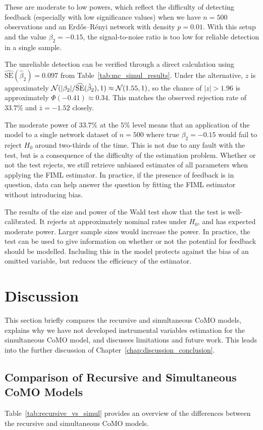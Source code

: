 These are moderate to low powers, which reflect the difficulty of detecting feedback (especially with low significance values) when we have $n = 500$ observations and an Erd\H{o}s--R\'enyi network with density $p = 0.01$. With this setup and the value $\beta_2 = -0.15$, the signal-to-noise ratio is too low for reliable detection in a single sample.

The unreliable detection can be verified through a direct calculation using $\widehat{\text{SE}}(\hat\beta_2) = 0.097$ from Table~\ref{tab:mc_simul_results}. Under the alternative, $z$ is approximately $\mathcal{N}(|\beta_2|/\widehat{\text{SE}}(\hat\beta_2), 1) \approx \mathcal{N}(1.55, 1)$, so the chance of $|z| > 1.96$ is approximately $\Phi(-0.41) \approx 0.34$. This matches the observed rejection rate of $33.7\%$ and $\bar z = -1.52$ closely.

The moderate power of $33.7\%$ at the $5\%$ level means that an application of the model to a single network dataset of $n = 500$ where true $\beta_2 = -0.15$ would fail to reject $H_0$ around two-thirds of the time. This is not due to any fault with the test, but is a consequence of the difficulty of the estimation problem. Whether or not the test rejects, we still retrieve unbiased estimates of all parameters when applying the FIML estimator. In practice, if the presence of feedback is in question, data can help answer the question by fitting the FIML estimator without introducing bias.

The results of the size and power of the Wald test show that the test is well-calibrated. It rejects at approximately nominal rates under $H_0$, and has expected moderate power. Larger sample sizes would increase the power. In practice, the test can be used to give information on whether or not the potential for feedback should be modelled. Including this in the model protects against the bias of an omitted variable, but reduces the efficiency of the estimator.

\section{Discussion}
\label{sec:simul:discussion}
This section briefly compares the recursive and simultaneous CoMO models, explains why we have not developed instrumental variables estimation for the simultaneous CoMO model, and discusses limitations and future work. This leads into the further discussion of Chapter~\ref{chap:discussion_conclusion}.

\subsection{Comparison of Recursive and Simultaneous CoMO Models}
\label{sec:simul:comparison}
Table~\ref{tab:recursive_vs_simul} provides an overview of the differences between the recursive and simultaneous CoMO models.

